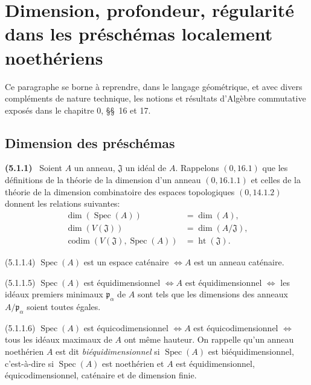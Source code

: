 \documentclass[10pt,oneside]{book}
\newenvironment{env}[1][]{\par\medskip\noindent\textbf{(#1)}\ }{\par}
\begin{document}
\section{Dimension, profondeur, régularité dans les préschémas localement
noethériens}

Ce paragraphe se borne à reprendre, dans le langage géométrique, et avec
divers compléments de nature technique, les notions et résultats d'Algèbre
commutative exposés dans le chapitre 0, \S\S~16 et 17.

\subsection{Dimension des préschémas}

\begin{env}[5.1.1]
\label{IV.2.5.1.1-fr}
Soient $A$ un anneau, $\mathfrak J$ un idéal de $A$. Rappelons
$(0,16.1)$ que les définitions de la théorie de la dimension d'un anneau
$(0,16.1.1)$ et celles de la théorie de la dimension combinatoire des espaces
topologiques $(0,14.1.2)$ donnent les relations suivantes:
\begin{align}
\dim(\operatorname{Spec}(A))&=\dim(A),
\tag{5.1.1.1}\label{IV.2.5.1.1.1-fr}\\
\dim(V(\mathfrak J))&=\dim(A/\mathfrak J),
\tag{5.1.1.2}\label{IV.2.5.1.1.2-fr}\\
\operatorname{codim}(V(\mathfrak J),\operatorname{Spec}(A))
&=\operatorname{ht}(\mathfrak J).
\tag{5.1.1.3}\label{IV.2.5.1.1.3-fr}
\end{align}
\par\noindent\textup{(5.1.1.4)} $\operatorname{Spec}(A)$ est un espace
caténaire $\Longleftrightarrow A$ est un anneau caténaire.
\par\noindent\textup{(5.1.1.5)} $\operatorname{Spec}(A)$ est
équidimensionnel $\Longleftrightarrow A$ est équidimensionnel
$\Longleftrightarrow$ les idéaux premiers minimaux $\mathfrak p_\alpha$ de
$A$ sont tels que les dimensions des anneaux $A/\mathfrak p_\alpha$ soient
toutes égales.
\par\noindent\textup{(5.1.1.6)} $\operatorname{Spec}(A)$ est
équicodimensionnel $\Longleftrightarrow A$ est équicodimensionnel
$\Longleftrightarrow$ tous les idéaux maximaux de $A$ ont même hauteur.
On rappelle qu'un anneau noethérien $A$ est dit \emph{biéquidimensionnel} si
$\operatorname{Spec}(A)$ est biéquidimensionnel, c'est-à-dire si
$\operatorname{Spec}(A)$ est noethérien et $A$ est équidimensionnel,
équicodimensionnel, caténaire et de dimension finie.
\end{env}
\end{document}
